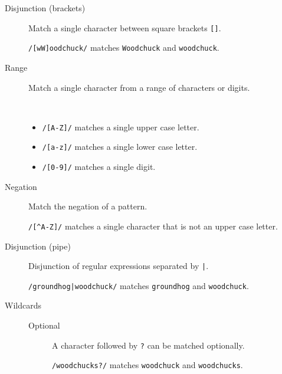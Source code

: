 \begin{description}
    \item[Disjunction (brackets)]
        Match a single character between square brackets \texttt{[]}.

        \begin{example}
            \texttt{/[wW]oodchuck/} matches \texttt{Woodchuck} and \texttt{woodchuck}.
        \end{example}

    \item[Range]
        Match a single character from a range of characters or digits.

        \begin{example} \phantom{}\\[-1.5em]
            \begin{itemize}
                \item \texttt{/[A-Z]/} matches a single upper case letter.
                \item \texttt{/[a-z]/} matches a single lower case letter.
                \item \texttt{/[0-9]/} matches a single digit.
            \end{itemize}
        \end{example}

    \item[Negation]
        Match the negation of a pattern.

        \begin{example}
            \texttt{/[\textasciicircum A-Z]/} matches a single character that is not an upper case letter.
        \end{example}

    \item[Disjunction (pipe)]
        Disjunction of regular expressions separated by \texttt{|}.

        \begin{example}
            \texttt{/groundhog|woodchuck/} matches \texttt{groundhog} and \texttt{woodchuck}.
        \end{example}


    \item[Wildcards] \phantom{}
        \begin{description}
            \item[Optional]
                A character followed by \texttt{?} can be matched optionally.

                \begin{example}
                    \texttt{/woodchucks?/} matches \texttt{woodchuck} and \texttt{woodchucks}.
                \end{example}


\end{description}
\end{description}
